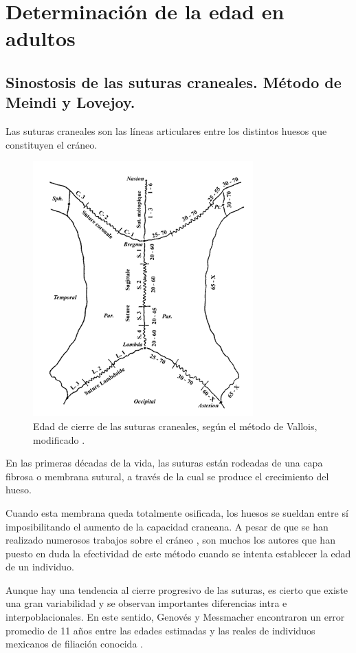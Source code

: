 \documentclass[a4paper,11pt]{article}
\begin{document}
\section{Determinación de la edad en adultos}
\subsection{Sinostosis de las suturas craneales. Método de Meindi y Lovejoy.}
Las suturas craneales son las líneas articulares entre los distintos huesos que constituyen el cráneo.
\begin{figure}[h!]
\centering
\includegraphics[scale=1]{9}
\caption{Edad de cierre de las suturas craneales, según el método de Vallois, modificado \cite{olivier1960pratique}.}
\end{figure}
En las primeras décadas de la vida, las suturas están rodeadas de una capa fibrosa o membrana sutural, a través de la cual se produce el crecimiento del hueso.

Cuando esta membrana queda totalmente osificada, los huesos se sueldan entre sí imposibilitando el aumento de la capacidad craneana. A pesar de que se han realizado numerosos trabajos sobre el cráneo \cite{todd1924endocranial, mckern1957skeletal, nemeskeri1960methoden},  son muchos los autores que han puesto en duda la efectividad de este método cuando se intenta establecer la edad de un individuo\cite{masset1989age}.

Aunque hay una tendencia al cierre progresivo de las suturas, es cierto que existe una gran variabilidad y se observan importantes diferencias intra e interpoblacionales. En este sentido, Genovés y Messmacher encontraron un error promedio de 11 años entre las edades estimadas y las reales de individuos mexicanos de filiación conocida \cite{genoves1959valor}.
\end{document}
